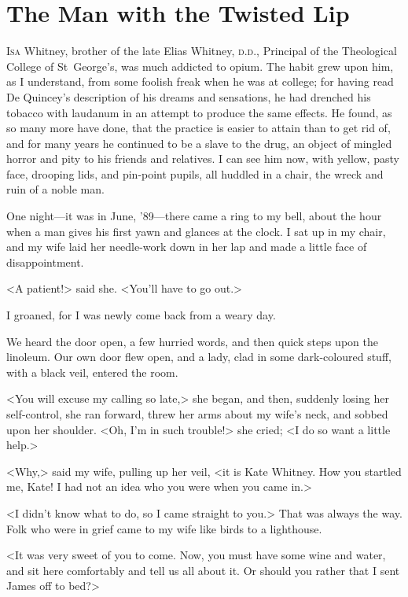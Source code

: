 \chapter{The Man with the Twisted Lip}
\lettrine[lines=4]{I}{sa} Whitney, brother of the late Elias Whitney, \textsc{d.d.}, Principal of the Theological College of St~George's, was much addicted to opium. The habit grew upon him, as I understand, from some foolish freak when he was at college; for having read De Quincey's description of his dreams and sensations, he had drenched his tobacco with laudanum in an attempt to produce the same effects. He found, as so many more have done, that the practice is easier to attain than to get rid of, and for many years he continued to be a slave to the drug, an object of mingled horror and pity to his friends and relatives. I can see him now, with yellow, pasty face, drooping lids, and pin-point pupils, all huddled in a chair, the wreck and ruin of a noble man.

One night—it was in June, '89—there came a ring to my bell, about the hour when a man gives his first yawn and glances at the clock. I sat up in my chair, and my wife laid her needle-work down in her lap and made a little face of disappointment.

<A patient!> said she. <You'll have to go out.>

I groaned, for I was newly come back from a weary day.

We heard the door open, a few hurried words, and then quick steps upon the linoleum. Our own door flew open, and a lady, clad in some dark-coloured stuff, with a black veil, entered the room.

<You will excuse my calling so late,> she began, and then, suddenly losing her self-control, she ran forward, threw her arms about my wife's neck, and sobbed upon her shoulder. <Oh, I'm in such trouble!> she cried; <I do so want a little help.>

<Why,> said my wife, pulling up her veil, <it is Kate Whitney. How you startled me, Kate! I had not an idea who you were when you came in.>

<I didn't know what to do, so I came straight to you.> That was always the way. Folk who were in grief came to my wife like birds to a lighthouse.

<It was very sweet of you to come. Now, you must have some wine and water, and sit here comfortably and tell us all about it. Or should you rather that I sent James off to bed?>

